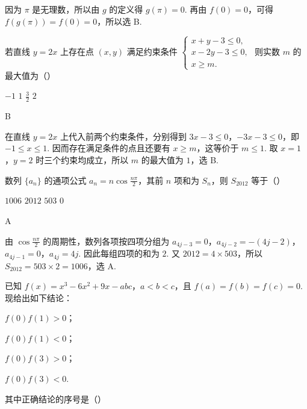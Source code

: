 \begin{solution}
因为 \(\pi\) 是无理数，所以由 \(g\) 的定义得 \(g(\pi)=0\). 再由 \(f(0)=0\)，可得 \(f(g(\pi))=f(0)=0\)，所以选 B.
\end{solution}

\begin{problem}
若直线 \( y = 2x \) 上存在点 \((x, y)\) 满足约束条件 \(\begin{cases}
x + y - 3 \leqslant 0,\\
x - 2y - 3 \leqslant 0,\\
x \geqslant m.
\end{cases}\) 则实数 \( m \) 的最大值为（\quad）

\choices
    {\(-1\)}
    {\(1\)}
    {\( \frac{3}{2} \)}
    {\(2\)}
\end{problem}

\begin{answer}
B
\end{answer}

\begin{solution}
在直线 \(y=2x\) 上代入前两个约束条件，分别得到
\(3x-3\leqslant0\)，\(-3x-3\leqslant0\)，即 \(-1\leqslant x\leqslant1\). 因而存在满足条件的点且还要有 \(x\geqslant m\)，这等价于 \(m\leqslant1\). 取 \(x=1\)，\(y=2\) 时三个约束均成立，所以 \(m\) 的最大值为 \(1\)，选 B.
\end{solution}

\begin{problem}
数列 \(\{a_{n}\}\) 的通项公式 \(a_{n} = n\cos \frac{n\pi}{2}\)，其前 \(n\) 项和为 \(S_{n}\)，则 \(S_{2012}\) 等于（\quad）

\choices
    {\(1006\)}
    {\(2012\)}
    {\(503\)}
    {\(0\)}
\end{problem}

\begin{answer}
A
\end{answer}

\begin{solution}
由 \(\cos\frac{n\pi}{2}\) 的周期性，数列各项按四项分组为
\(a_{4j-3}=0\)，\(a_{4j-2}=-(4j-2)\)，\(a_{4j-1}=0\)，\(a_{4j}=4j\). 因此每组四项的和为 \(2\). 又 \(2012=4\times503\)，所以
\(S_{2012}=503\times2=1006\)，选 A.
\end{solution}

\begin{problem}
已知 \(f(x)=x^{3}-6x^{2}+9x-abc\)，\(a<b<c\)，且 \( f(a)=f(b)=f(c)=0 \). 现给出如下结论：
\begin{circlelist}
\item \( f(0)f(1)>0 \)；
\item \( f(0)f(1)<0 \)；
\item \( f(0)f(3)>0 \)；
\item \( f(0)f(3)<0 \).
\end{circlelist}
其中正确结论的序号是（\quad）

\choices
    {}
    {}
    {}
    {}
\end{problem}

